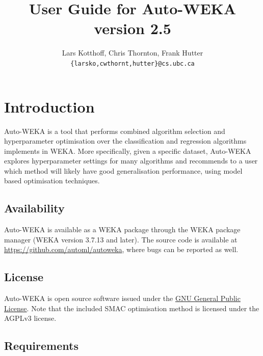 \documentclass{article}
\def\version{2.5}
\begin{document}
\title{User Guide for Auto-WEKA version \version}

\author{
Lars Kotthoff, Chris Thornton, Frank Hutter\\
\texttt{\{larsko,cwthornt,hutter\}@cs.ubc.ca}
}

\maketitle

\tableofcontents

\section{Introduction}\label{sec:intro}

Auto-WEKA is a tool that performs combined algorithm selection and hyperparameter
optimisation over the classification and regression algorithms implements in
WEKA. More specifically, given a specific dataset, Auto-WEKA explores
hyperparameter settings for many algorithms and recommends to a user which
method will likely have good generalisation performance, using model based
optimisation techniques.

\subsection{Availability}

Auto-WEKA is available as a WEKA package through the WEKA package manager (WEKA
version 3.7.13 and later). The source code is available at
\url{https://github.com/automl/autoweka}, where bugs can be reported as
well.

\subsection{License}

Auto-WEKA is open source software issued under the
\href{http://www.gnu.org/licenses/gpl.html}{GNU General Public License}. Note
that the included SMAC optimisation method is licensed under the AGPLv3 license.

\subsection{Requirements}
\end{document}
